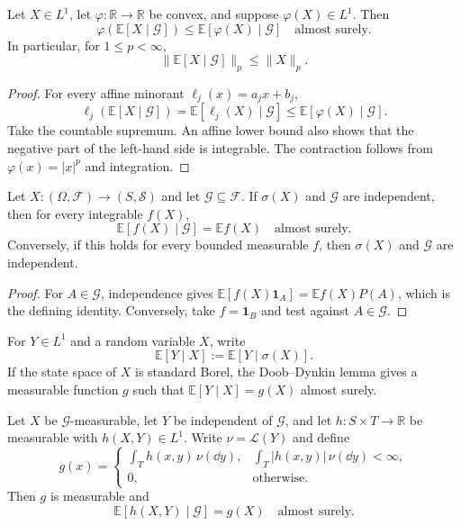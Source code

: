 \begin{thm}
Let $X\in L^1$, let $\varphi:\mathbb R\to\mathbb R$ be convex, and suppose
$\varphi(X)\in L^1$. Then
\[
\varphi(\mathbb E[X\mid\mathcal G])
 \leq\mathbb E[\varphi(X)\mid\mathcal G]
\quad\text{almost surely}.
\]
In particular, for $1\leq p<\infty$,
\[
\|\mathbb E[X\mid\mathcal G]\|_p\leq\|X\|_p.
\]
\end{thm}

\begin{proof}
For every affine minorant $\ell_j(x)=a_jx+b_j$,
\[
\ell_j(\mathbb E[X\mid\mathcal G])
 =\mathbb E[\ell_j(X)\mid\mathcal G]
 \leq\mathbb E[\varphi(X)\mid\mathcal G].
\]
Take the countable supremum. An affine lower bound also shows that the
negative part of the left-hand side is integrable. The contraction follows
from $\varphi(x)=|x|^p$ and integration.
\end{proof}

\begin{prop}
Let $X:(\Omega,\mathcal F)\to(S,\mathcal S)$ and let
$\mathcal G\subseteq\mathcal F$. If $\sigma(X)$ and $\mathcal G$ are
independent, then for every integrable $f(X)$,
\[
\mathbb E[f(X)\mid\mathcal G]=\mathbb E f(X)
\quad\text{almost surely}.
\]
Conversely, if this holds for every bounded measurable $f$, then
$\sigma(X)$ and $\mathcal G$ are independent.
\end{prop}

\begin{proof}
For $A\in\mathcal G$, independence gives
$\mathbb E[f(X)\mathbf1_A]=\mathbb Ef(X)P(A)$, which is the defining identity.
Conversely, take $f=\mathbf1_B$ and test against $A\in\mathcal G$.
\end{proof}

\begin{de}
For $Y\in L^1$ and a random variable $X$, write
\[
\mathbb E[Y\mid X]
 :=\mathbb E[Y\mid\sigma(X)].
\]
If the state space of $X$ is standard Borel, the Doob--Dynkin lemma gives a
measurable function $g$ such that
$\mathbb E[Y\mid X]=g(X)$ almost surely.
\end{de}

\begin{prop}
Let $X$ be $\mathcal G$-measurable, let $Y$ be independent of $\mathcal G$,
and let $h:S\times T\to\mathbb R$ be measurable with
$h(X,Y)\in L^1$. Write $\nu=\mathcal L(Y)$ and define
\[
g(x)=
\begin{cases}
 \displaystyle\int_T h(x,y)\,\nu(\dd y),
   &\displaystyle\int_T|h(x,y)|\,\nu(\dd y)<\infty,\\[6pt]
 0,&\text{otherwise}.
\end{cases}
\]
Then $g$ is measurable and
\[
\mathbb E[h(X,Y)\mid\mathcal G]=g(X)
\quad\text{almost surely}.
\]
\end{prop}

